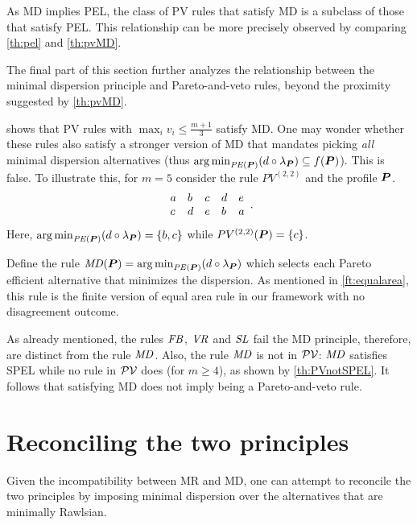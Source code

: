 \documentclass[version=3.21, pagesize, twoside=off, bibliography=totoc, DIV=calc, fontsize=12pt, a4paper]{scrartcl}
\begin{document}
\begin{remark}
   As MD implies PEL, the class of PV rules that satisfy MD is a subclass of those that satisfy PEL. This relationship can be more precisely observed by comparing \cref{th:pel} and \cref{th:pvMD}. 
\end{remark}

The final part of this section further analyzes the relationship between the minimal dispersion principle and Pareto-and-veto rules, beyond the proximity suggested by \cref{th:pvMD}. 

\begin{remark}
	 shows that PV rules with $\max_i v_i ≤ \frac{m + 1}{3}$ satisfy MD. One may wonder whether these rules also satisfy a stronger version of MD that mandates picking \emph{all} minimal dispersion alternatives (thus $\argmin_{\PE} (d \circ \lprof) \subseteq f(\prof)$). This is false. To illustrate this, for $m = 5$ consider the rule $PV^{(2, 2)}$ and the profile $\bm{P}$.
	\begin{equation}
		\begin{array}{*5{l}}
			a& b & c & d & e \\
			c& d & e & b & a\\
		\end{array}.
	\end{equation}
	Here, $\argmin_{\PE} (d \circ \lprof) = \set{b, c}$ while $PV^{(2, 2)}(\bm{P}) = \{c\}$.
\end{remark}

Define the rule $\MD(\prof) = \argmin_{\PE}(d \circ \lprof)$ which selects each Pareto efficient alternative that minimizes the dispersion. As mentioned in \cref{ft:equalarea}, this rule is the finite version of  equal area rule in our framework with no disagreement outcome. 

\begin{remark}
	As already mentioned, the rules $\mathit{FB}$, $\mathit{VR}$ and $\mathit{SL}$ fail the MD principle, therefore, are distinct from the rule $\mathit{MD}$. Also,
the rule $\mathit{MD}$ is not in $\mathcal{PV}$: $\mathit{MD}$ satisfies SPEL while no rule in $\mathcal{PV}$ does (for $m ≥ 4$), as shown by \cref{th:PVnotSPEL}.
    It follows that satisfying MD does not imply being a Pareto-and-veto rule.
\end{remark}

\section{Reconciling the two principles}
\label{sec:reconc}
Given the incompatibility between MR and MD, one can attempt to reconcile the two principles by imposing minimal dispersion over the alternatives that are minimally Rawlsian. 
\end{document}
